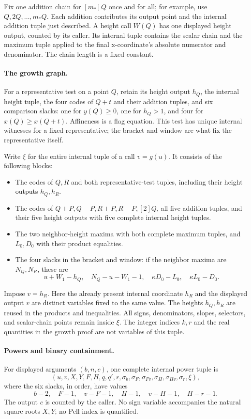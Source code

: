 Fix one addition chain for \([m_*]Q\) once and for all; for example, use
\(Q,2Q,\ldots,m_*Q\). Each addition contributes its output point and the
internal addition tuple just described. A height call \(W(Q)\) has one
displayed height output, counted by its caller. Its internal tuple contains
the scalar chain and the maximum tuple applied to the final x-coordinate's
absolute numerator and denominator. The chain length is a fixed constant.

\paragraph{The growth graph.}
For a representative test on a point \(Q\), retain its height output
\(h_Q\), the internal height tuple, the four codes of \(Q+t\) and their
addition tuples, and six comparison slacks: one for \(y(Q)\ge0\), one for
\(h_Q>1\), and four for \(x(Q)\ge x(Q+t)\). Affineness is a flag equation.
This test has unique internal witnesses for a fixed representative; the
bracket and window are what fix the representative itself.

Write \(\xi\) for the entire internal tuple of a call \(v=g(u)\).
It consists of the following blocks:
\begin{itemize}
\item The codes of \(Q,R\) and both representative-test tuples, including
      their height outputs \(h_Q,h_R\).
\item The codes of \(Q+P,Q-P,R+P,R-P,[2]Q\), all five addition tuples,
      and their five height outputs with five complete internal height tuples.
\item The two neighbor-height maxima with both complete maximum tuples,
      and \(L_0,D_0\) with their product equalities.
\item The four slacks in the bracket and window: if the neighbor maxima
      are \(N_Q,N_R\), these are
      \[
       u+W_1-h_Q,\quad N_Q-u-W_1-1,\quad
       \kappa D_0-L_0,\quad \kappa L_0-D_0.
      \]
\end{itemize}
Impose \(v=h_R\). Here the already present internal coordinate \(h_R\)
and the displayed output \(v\) are distinct variables fixed to the same
value. The heights \(h_Q,h_R\) are reused in the products and inequalities.
All signs, denominators, slopes, selectors, and scalar-chain points remain
inside \(\xi\). The integer indices \(k,r\) and the real quantities in
the growth proof are not variables of this tuple.

\paragraph{Powers and binary containment.}
For displayed arguments \((b,n,c)\), one complete internal power tuple is
\[
 (u,v,X,Y,F,H,q,q',r,\sigma_b,\sigma_F,\sigma_{Fv},
       \sigma_H,\sigma_{Hv},\sigma_r,\xi),
\]
where the six slacks, in order, have values
\[
 b-2,\quad F-1,\quad v-F-1,\quad
 H-1,\quad v-H-1,\quad H-r-1.
\]
The output \(c\) is counted by the caller. No sign variable accompanies
the natural square roots \(X,Y\); no Pell index is quantified.

